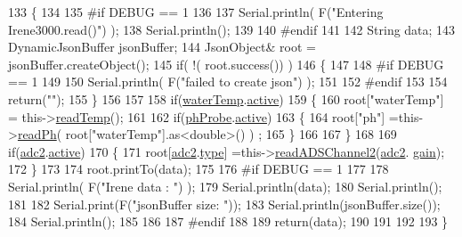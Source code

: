 \begin{DoxyCode}
133 \{
134 
135 \textcolor{preprocessor}{#if DEBUG == 1 }
136     
137     Serial.println( F(\textcolor{stringliteral}{"Entering Irene3000.read()"}) );
138     Serial.println();
139 
140 \textcolor{preprocessor}{#endif }
141 
142     String data;
143     DynamicJsonBuffer jsonBuffer;
144     JsonObject& root = jsonBuffer.createObject();
145     \textcolor{keywordflow}{if}( !( root.success()) )
146     \{
147     
148 \textcolor{preprocessor}{    #if DEBUG == 1 }
149 
150         Serial.println( F(\textcolor{stringliteral}{"failed to create json"}) );
151     
152 \textcolor{preprocessor}{    #endif }
153 
154         \textcolor{keywordflow}{return}(\textcolor{stringliteral}{""});
155     \}
156 
157         
158     \textcolor{keywordflow}{if}(\hyperlink{class_irene3000_af05612c78c758ce9db316c75ad937130}{waterTemp}.\hyperlink{struct_irene3000_1_1state_a879828ace7e7a7bc91ff703bfee36599}{active})
159     \{
160         root[\textcolor{stringliteral}{"waterTemp"}] = this->\hyperlink{class_irene3000_a80bc6dfea106dc3bc54fa20204d4d5dc}{readTemp}();
161 
162         \textcolor{keywordflow}{if}(\hyperlink{class_irene3000_a997a4ee466fa1d5416e07e444965dc9e}{phProbe}.\hyperlink{struct_irene3000_1_1state_a879828ace7e7a7bc91ff703bfee36599}{active})
163         \{
164             root[\textcolor{stringliteral}{"ph"}] =this->\hyperlink{class_irene3000_a436fc0a06681cd0784aba56b9707f19a}{readPh}( root[\textcolor{stringliteral}{"waterTemp"}].as<double>() ) ;
165         \}
166 
167     \}
168 
169     \textcolor{keywordflow}{if}(\hyperlink{class_irene3000_aae3a95a1c83c766cd2f299ce471c337e}{adc2}.\hyperlink{struct_irene3000_1_1state_a879828ace7e7a7bc91ff703bfee36599}{active})
170     \{
171         root[\hyperlink{class_irene3000_aae3a95a1c83c766cd2f299ce471c337e}{adc2}.\hyperlink{struct_irene3000_1_1state_a9897a7e02727db6351d44006eec73799}{type}] =this->\hyperlink{class_irene3000_ae73bd2ed14a199a7e83f4d6458476a7c}{readADSChannel2}(\hyperlink{class_irene3000_aae3a95a1c83c766cd2f299ce471c337e}{adc2}.
      \hyperlink{struct_irene3000_1_1state_a1ecf69d38cb31ecaf6b3602a3f3e93cb}{gain});
172     \}
173     
174     root.printTo(data);
175     
176 \textcolor{preprocessor}{#if DEBUG == 1 }
177 
178     Serial.println( F(\textcolor{stringliteral}{"Irene data : "}) );
179     Serial.println(data);
180     Serial.println();
181 
182     Serial.print(F(\textcolor{stringliteral}{"jsonBuffer size: "}));
183     Serial.println(jsonBuffer.size());
184     Serial.println();
185 
186 
187 \textcolor{preprocessor}{#endif}
188     
189     \textcolor{keywordflow}{return}(data);
190     
191     
192 
193 \}
\end{DoxyCode}
